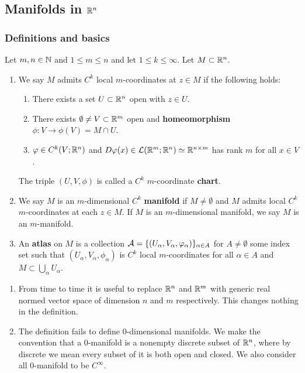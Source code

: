\documentclass[a4paper]{article}
\begin{document}
\subsection{Manifolds in $\mathbb{R}^n$}

\subsubsection{Definitions and basics}

\begin{defi}
Let $m, n \in \mathbb{N}$ and $1 \leq m \leq n$ and let
$1 \leq k \leq \infty$. Let $M \subset \mathbb{R}^n$.
\begin{enumerate}
\item We say $M$ admits $C^k$ local $m$-coordinates
at $z \in M$ if the following holds:
\begin{enumerate}
  \item There exists a set $U \subset \mathbb{R}^n$ open with
  $z \in U$.

  \item There exists $\emptyset \neq V \subset \mathbb{R}^m$ open
  and \textbf{homeomorphism} $\phi : V \to \phi(V) = M
  \cap U$.

  \item $\varphi \in C^k(V ; \mathbb{R}^n)$ and $D \varphi(x) \in \mathcal{L}(\mathbb{R}^m;
  \mathbb{R}^n) \simeq \mathbb{R}^{n \times m}$ has rank $m$ for all
  $x \in V$.
\end{enumerate}
The triple $(U, V, \phi)$ is called a $C^k$ $m$-coordinate
\textbf{chart}.

\item We say $M$ is an $m$-dimensional $C^k$ \textbf{manifold}
if $M \neq \emptyset$ and $M$ admits local $C^k$ $m$-coordinates
at each $z \in M$. If $M$ is an $m$-dimensional manifold,
we say $M$ is an $m$-manifold.

\item An \textbf{atlas} on $M$ is a collection
$\mathcal{A} = \{(U_\alpha, V_\alpha, \varphi_\alpha)\}_{\alpha \in A}$
for $A \neq \emptyset$ some index set such that
$(U_\alpha, V_\alpha, \phi_\alpha)$ is $C^k$ local $m$-coordinates
for all $\alpha \in A$ and $M \subset
\bigcup_\alpha U_\alpha$.
\end{enumerate}
\end{defi}

\begin{remark}
\begin{enumerate}
\item From time to time it is useful to replace $\mathbb{R}^n$
and $\mathbb{R}^m$ with generic real normed vector space of
dimension $n$ and $m$ respectively. This changes nothing
in the definition.

\item The definition fails to define $0$-dimensional
manifolds. We make the convention that a $0$-manifold is a
nonempty discrete subset of $\mathbb{R}^n$, where by discrete we mean
every subset of it is both open and closed. We also consider
all $0$-manifold to be $C^\infty$.
\end{enumerate}
\end{remark}
\end{document}
